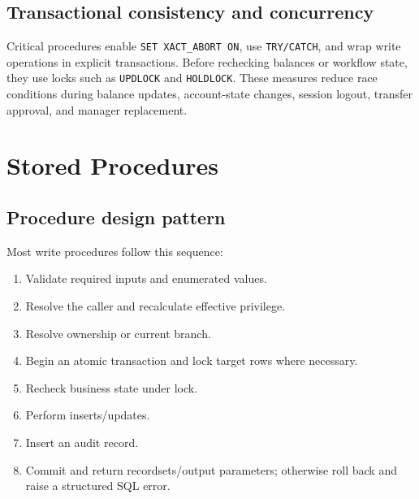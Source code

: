 \documentclass[11pt,a4paper,oneside]{report}
\begin{document}
\section{Transactional consistency and concurrency}
Critical procedures enable \texttt{SET XACT\_ABORT ON}, use \texttt{TRY/CATCH}, and wrap write operations in explicit transactions. Before rechecking balances or workflow state, they use locks such as \texttt{UPDLOCK} and \texttt{HOLDLOCK}. These measures reduce race conditions during balance updates, account-state changes, session logout, transfer approval, and manager replacement.

\chapter{Stored Procedures}
\section{Procedure design pattern}
Most write procedures follow this sequence:
\begin{enumerate}
\item Validate required inputs and enumerated values.
\item Resolve the caller and recalculate effective privilege.
\item Resolve ownership or current branch.
\item Begin an atomic transaction and lock target rows where necessary.
\item Recheck business state under lock.
\item Perform inserts\slash updates.
\item Insert an audit record.
\item Commit and return recordsets\slash output parameters; otherwise roll back and raise a structured SQL error.
\end{enumerate}
\end{document}
